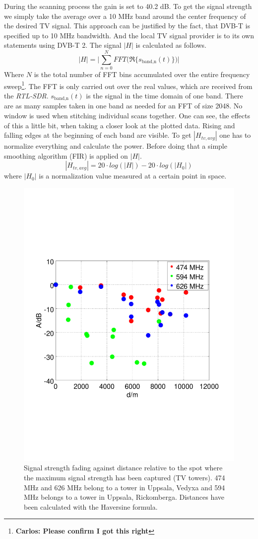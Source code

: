 \documentclass[conference]{IEEEtran}
\newcommand{\cp}[1]{\footnote{{\bf Carlos: #1}}}
\begin{document}
During the scanning process	the gain is set to 40.2 dB. To get the
signal strength we simply take the average over a 10 MHz band around the
center frequency of the desired TV signal. This approach can be justified by the fact, that DVB-T is specified up to 10 MHz bandwidth. And the local TV signal provider is to its own statements using DVB-T 2. The signal \ensuremath{|H|} is calculated as follows.
\begin{equation}
	|H| = \Biggl| \sum_{n=0}^N FFT\bigl( \Re\{ s_{\text{band,n}}(t) \} \bigr) \Biggr|
\end{equation}     
Where \ensuremath{N} is the total number of FFT bins accumulated over
the entire frequency sweep\cp{Please confirm I got this right}. The FFT
is only carried out over the real values, which are received from the
\textit{RTL-SDR}. \ensuremath{s_{\text{band,n}}(t)} is the signal in the
time domain of one band. There are as many samples taken in one band as
needed for an FFT of size 2048. No window is used when stitching
individual scans together. One can see, the effects of this a little bit, when taking a closer look at the plotted data. Rising and falling edges at the beginning of each band are visible. To get \ensuremath{|H_{tv,avg}|} one has to normalize everything and calculate the power. Before doing that a simple smoothing algorithm (FIR) is applied on \ensuremath{|H|}.
\begin{equation}
	|H_{tv,avg}| = 20 \cdot log (|H|) - 20 \cdot log(|H_0|)
\end{equation}   
where \ensuremath{|H_0|} is a normalization value measured at a certain
point in space. 
\begin{figure}[h]
\centering
\includegraphics[width=0.5\columnwidth]{./fig/haversine}
\caption{Signal strength fading against distance relative to the spot where the maximum signal strength has been captured (TV towers). 474 MHz and 626 MHz belong to a tower in Uppsala, Vedyxa and 594 MHz belongs to a tower in Uppsala, Rickomberga. Distances have been calculated with the Haversine formula.}
\label{fig:haversine}
\end{figure}
\end{document}
